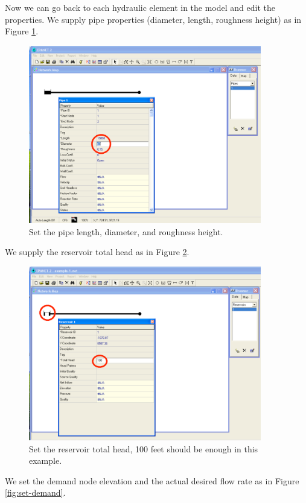\newpage
Now we can go back to each hydraulic element in the model and edit the properties.  We supply pipe properties (diameter, length, roughness height) as in Figure \ref{fig:link-properties}.
\begin{figure}[h!] %
   \centering
   \includegraphics[width=4in]{link-properties.pdf} 
   \caption{Set the pipe length, diameter, and roughness height.}
   \label{fig:link-properties}
\end{figure}
We supply the reservoir total head as in Figure \ref{fig:set-head}.
\begin{figure}[htbp] %
   \centering
   \includegraphics[width=4in]{set-head.pdf} 
   \caption{Set the reservoir total head, 100 feet should be enough in this example.}
   \label{fig:set-head}
\end{figure}
\clearpage
We set the demand node elevation and the actual desired flow rate as in Figure \ref{fig:set-demand}.

